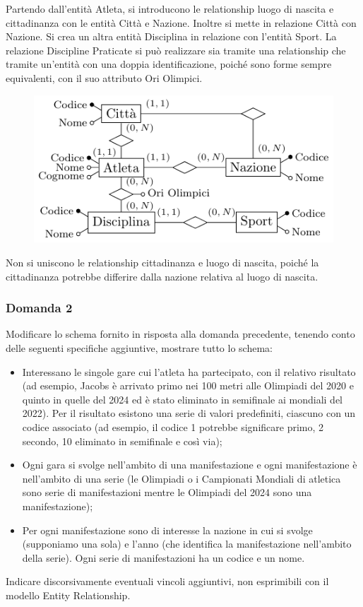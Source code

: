 \documentclass{article}
\numberwithin{equation}{subsection}
\begin{document}
Partendo dall'entità Atleta, si introducono le relationship luogo di nascita e cittadinanza con le entità Città e Nazione. Inoltre si mette in relazione Città con Nazione. 
Si crea un altra entità Disciplina in relazione con l'entità Sport. 
La relazione Discipline Praticate si può realizzare sia tramite una relationship che tramite un'entità con una doppia identificazione, poiché sono forme sempre equivalenti, con il suo attributo Ori Olimpici. 

\begin{figure}[H]%
    \centering%
    \includegraphics{schema_1_16-12-24.pdf}%
\end{figure}

Non si uniscono le relationship cittadinanza e luogo di nascita, poiché la cittadinanza potrebbe differire dalla nazione relativa al luogo di nascita. 

\subsubsection*{Domanda 2}

Modificare lo schema fornito in risposta alla domanda precedente, tenendo conto delle seguenti specifiche
aggiuntive, mostrare tutto lo schema:
\begin{itemize}
    \item Interessano le singole gare cui l'atleta ha partecipato, con il relativo risultato (ad esempio,
    Jacobs è arrivato primo nei 100 metri alle Olimpiadi del 2020 e quinto in quelle del 2024 ed è
    stato eliminato in semifinale ai mondiali del 2022). Per il risultato esistono una serie di valori
    predefiniti, ciascuno con un codice associato (ad esempio, il codice 1 potrebbe significare primo,
    2 secondo, 10 eliminato in semifinale e così via);
    \item Ogni gara si svolge nell'ambito di una manifestazione e ogni manifestazione è nell'ambito di una
    serie (le Olimpiadi o i Campionati Mondiali di atletica sono serie di manifestazioni mentre le
    Olimpiadi del 2024 sono una manifestazione);
    \item Per ogni manifestazione sono di interesse la nazione in cui si svolge (supponiamo una sola) e
    l'anno (che identifica la manifestazione nell'ambito della serie). Ogni serie di manifestazioni ha
    un codice e un nome.
\end{itemize}
Indicare discorsivamente eventuali vincoli aggiuntivi, non esprimibili con il modello Entity Relationship.
\end{document}
